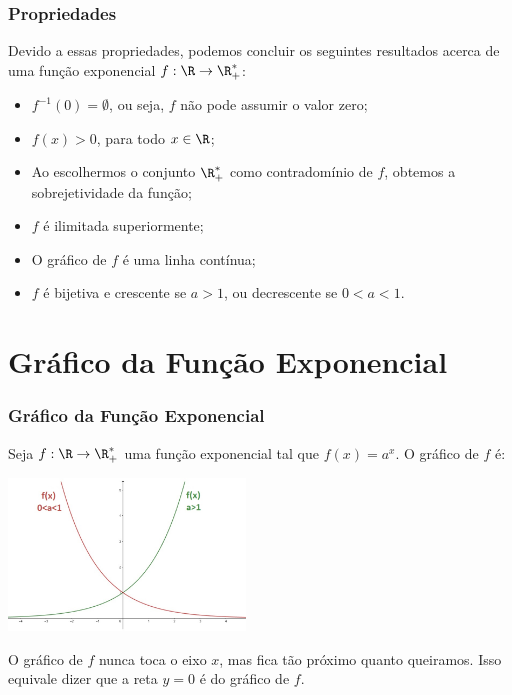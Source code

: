 \documentclass[brazil, notheorems, 10pt]{beamer}
\begin{document}
\begin{frame}
\frametitle{Propriedades} %

Devido a essas propriedades, podemos concluir os seguintes
resultados acerca de uma função exponencial $f: \R \to \R_+^\ast$:
\begin{itemize}
	\item $f^{-1}(0) = \emptyset$, ou seja, $f$ não pode assumir o valor
	zero;
	\item $f(x)>0$, para todo $x \in \R$;
	\item Ao escolhermos o conjunto $\R_+^\ast$ como contradomínio de $f$, obtemos
	a sobrejetividade da função;
	\item $f$ é ilimitada superiormente;
	\item O gráfico de $f$ é uma linha contínua;
	\item $f$ é bijetiva e crescente se $a>1$, ou decrescente se
	$0<a<1$.
\end{itemize}
\end{frame}



\section{Gráfico da Função Exponencial}
\begin{frame}
\frametitle{Gráfico da Função Exponencial} %

\begin{exemplo}
Seja $f: \R \to \R_+^\ast$ uma função exponencial tal que $f(x) =
a^x$. O gráfico de $f$ é:
\begin{center}
\includegraphics[width=6.3cm]{figures/grafexp.jpg}
\end{center}
O gráfico de $f$ nunca toca o eixo $x$, mas fica tão próximo quanto
queiramos. Isso equivale dizer que a reta $y=0$ é  do
gráfico de $f$.
\end{exemplo}

\end{frame}
\end{document}
